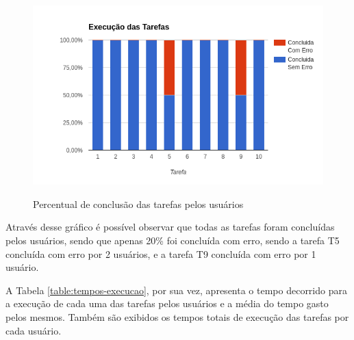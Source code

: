 \begin{figure}[!htb]
    \centering
    \caption{Percentual de conclusão das tarefas pelos usuários}
    \includegraphics[width=1\textwidth]{./04-figuras/avaliacao-tarefas}
    \label{fig:avaliacao-tarefas}
\end{figure}

Através desse gráfico é possível observar que todas as tarefas foram concluídas pelos 
usuários, sendo que apenas 20\% foi concluída com erro, sendo a tarefa T5 concluída com 
erro por 2 usuários, e a tarefa T9 concluída com erro por 1 usuário.

A Tabela \ref{table:tempos-execucao}, por sua vez, apresenta o tempo decorrido para a execução 
de cada uma das tarefas pelos usuários e a média do tempo gasto pelos mesmos. Também são 
exibidos os tempos totais de execução das tarefas por cada usuário.

